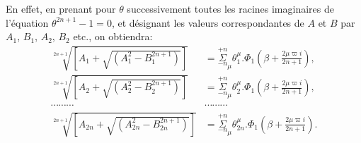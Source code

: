 \documentclass{article}
\begin{document}
En effet, en prenant pour $\theta$ successivement toutes les racines imaginaires de l'équation $\theta^{2n+1}-1=0$, et désignant les valeurs correspondantes de $A$ et $B$ par $A_{1}$, $B_{1}$, $A_{2}$, $B_{2}$ etc., on obtiendra:
\[ \begin{aligned}
\sqrt[2n+1]{[A_{1}+\sqrt{(A_{1}^{2}-B_{1}^{2n+1})}]}&=\overset{+n}{\underset{-n}{\Sigma}}_{\mu}\theta_{1}^{\mu}.\Phi_{1}\left(\beta+\frac{2\mu\varpi i}{2n+1}\right),\\
\sqrt[2n+1]{[A_{2}+\sqrt{(A_{2}^{2}-B_{2}^{2n+1})}]}&=\overset{+n}{\underset{-n}{\Sigma}}_{\mu}\theta_{2}^{\mu}.\Phi_{1}\left(\beta+\frac{2\mu\varpi i}{2n+1}\right),\\
\cdots\cdots\cdots&\cdots\cdots\cdots\\
\sqrt[2n+1]{[A_{2n}+\sqrt{(A_{2n}^{2}-B_{2n}^{2n+1})}]}&=\overset{+n}{\underset{-n}{\Sigma}}_{\mu}\theta_{2n}^{\mu}.\Phi_{1}\left(\beta+\frac{2\mu\varpi i}{2n+1}\right).
\end{aligned} \]
\end{document}
